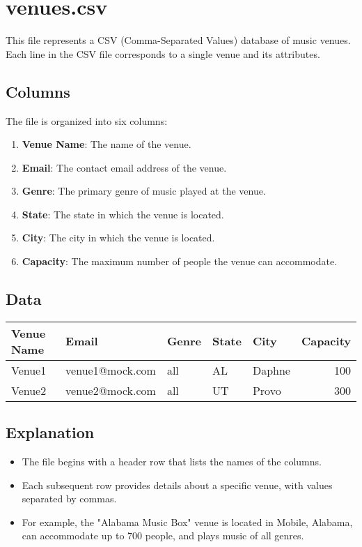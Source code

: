 \documentclass{article}
\begin{document}
	\section{venues.csv}
	
	This file represents a CSV (Comma-Separated Values) database of music venues. Each line in the CSV file corresponds to a single venue and its attributes.
	
	\subsection*{Columns}
	The file is organized into six columns:
	\begin{enumerate}
		\item \textbf{Venue Name}: The name of the venue.
		\item \textbf{Email}: The contact email address of the venue.
		\item \textbf{Genre}: The primary genre of music played at the venue.
		\item \textbf{State}: The state in which the venue is located.
		\item \textbf{City}: The city in which the venue is located.
		\item \textbf{Capacity}: The maximum number of people the venue can accommodate.
	\end{enumerate}
	
	\subsection*{Data}
	
	\begin{tabular}{|l|l|l|l|l|r|}
		\hline
		\textbf{Venue Name} & \textbf{Email} & \textbf{Genre} & \textbf{State} & \textbf{City} & \textbf{Capacity} \\
		\hline
		Venue1 & venue1@mock.com & all & AL & Daphne & 100 \\
		\hline
		Venue2 & venue2@mock.com & all & UT & Provo & 300 \\
		\hline
	\end{tabular}
	
	\subsection*{Explanation}
	\begin{itemize}
		\item The file begins with a header row that lists the names of the columns.
		\item Each subsequent row provides details about a specific venue, with values separated by commas.
		\item For example, the "Alabama Music Box" venue is located in Mobile, Alabama, can accommodate up to 700 people, and plays music of all genres.
	\end{itemize}
	
\end{document}
